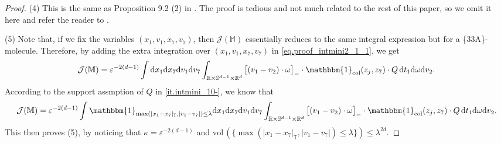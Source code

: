 \documentclass[10pt, reqno]{amsart}
\newcommand{\Mb}{\mathbb M}
\newcommand{\Rb}{\mathbb R}
\newcommand{\Sb}{\mathbb S}
\newcommand{\Tb}{\mathbb T}
\newcommand {\Jc}{\mathcal J}
\theoremstyle{definition}
\theoremstyle{remark}
\numberwithin{equation}{section}
\begin{document}
\begin{proof}
(4) This is the same as Proposition 9.2 (2) in \cite{DHM24}. The proof is tedious and not much related to the rest of this paper, so we omit it here and refer the reader to \cite{DHM24}.

(5) Note that, if we fix the variables $(x_1,v_1,x_7,v_7)$, then $\Jc(\Mb)$ essentially reduces to the same integral expression but for a \{33A\}-molecule. Therefore, by adding the extra integration over $(x_1,v_1,x_7,v_7)$ in \eqref{eq.proof_intmini2_1_1}, we get
\begin{equation}
    \Jc(\Mb)=\varepsilon^{-2(d-1)}\int \mathrm{d}x_1\mathrm{d}x_7\mathrm{d}v_1\mathrm{d}v_7\int_{\Rb\times\Sb^{d-1}\times\Rb^d}\big[(v_1-v_2)\cdot\omega\big]_-\cdot \mathbbm{1}_{\mathrm{col}}(z_j,z_7)\cdot Q\,\mathrm{d}t_1\mathrm{d}\omega\mathrm{d}v_2.
\end{equation} 
According to the support assmption of $Q$ in \eqref{it.intmini_10-}, we know that 
\begin{equation*}
    \Jc(\Mb)=\varepsilon^{-2(d-1)}\int \mathbbm{1}_{\max(|x_1-x_7|_\Tb,|v_1-v_7|)\leq \lambda} \mathrm{d}x_1\mathrm{d}x_7\mathrm{d}v_1\mathrm{d}v_7\int_{\Rb\times\Sb^{d-1}\times\Rb^d}\big[(v_1-v_2)\cdot\omega\big]_-\cdot \mathbbm{1}_{\mathrm{col}}(z_j,z_7)\cdot Q\,\mathrm{d}t_1\mathrm{d}\omega\mathrm{d}v_2.
\end{equation*} This then proves (5), by noticing that $\kappa=\varepsilon^{-2(d-1)}$ and $\mathrm{vol}\, (\{\max(|x_1-x_7|_\Tb,|v_1-v_7|)\leq \lambda\})\le \lambda^{2d}$.
\end{proof}
\end{document}
